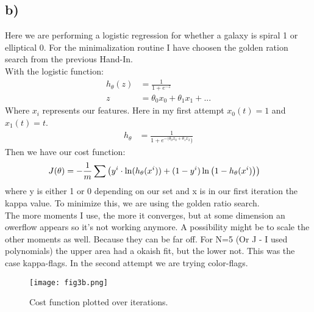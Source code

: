 \subsection{b)}
Here we are performing a logistic regression for whether a galaxy is spiral 1 or elliptical 0. For the minimalization routine I have choosen the golden ration search from the previous Hand-In. \\
With the logistic function: 
\begin{align}
    h_\theta(z) &= \frac{1}{1+e^{-z}}\\
    z &= \theta_0 x_0 + \theta_1 x_1 + ... 
\end{align}
Where $x_i$ represents our features. Here in my first attempt  $x_0(t) = 1$ and $x_{1}(t) = t$. 
\begin{align}
    h_\theta &= \frac{1}{1+e^{-(\theta_0 x_0+ \theta_1 x_2})}
\end{align}
Then we have our cost function: 
\begin{align}
    J(\theta) &= - \frac{1}{m} \sum \left({y^{i}  \cdot \ln(h_\theta (x^{i})) + (1-y^{i})\ln\left({1-h_\theta(x^{i})}\right)}\right)
\end{align}
where y is either 1 or 0 depending on our set and x is in our first iteration the kappa value. To minimize this, we are using the golden ratio search. \\

The more moments I use, the more it converges, but at some dimension an owerflow appears so it's not working anymore. A possibility might be to scale the other moments as well. Because they can be far off. For N=5 (Or J - I used polynomials) the upper area had a okaish fit, but the lower not. This was the case kappa-flags. 
In the second attempt we are trying color-flags.

\begin{figure}[h!]
    \centering
    \texttt{[image: fig3b.png]}
    \caption{Cost function plotted over iterations.}
\end{figure}


